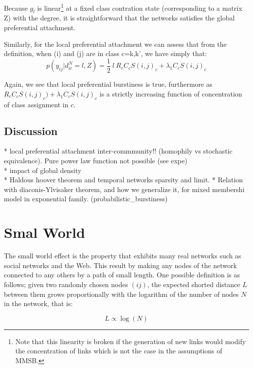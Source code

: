 \documentclass[a4paper, 12pt]{article}
\begin{document}
Because $g_l$ is linear\footnote{Note that this linearity is broken if the generation of new links would modify the concentration of links which is not the case in the assumptions of MMSB.} at a fixed class contration state (corresponding to a matrix Z) with the degree, it is straightforward  that the networks satisfies the global preferential attachment.

Similarly, for the local preferential attachment we can assess that from the definition, when (i) and (j) are in class c={k,k'}, we have simply that:
\begin{equation}
p(y_{ij} | d_{ic}^N=l, Z) = \frac{1}{2}\ l\ R_c  C_c S(i,j)_c + \lambda_1 C_c S(i,j)_c
\end{equation}

Again, we see that local preferential burstiness is true, furthermore as $ R_c  C_c  S(i,j)_c) + \lambda_1 C_c S(i,j)_c$ is a strictly increasing function of concentration of class assignment in $c$.

\subsection{Discussion}


* local preferential attachment inter-commmunity!! (homophily vs stochastic equivalence). Pure power law function not possible (see expe)\\
* impact of global density\\
* Haldous hoover theorem and temporal networks sparsity and limit.
* Relation with diaconis-Ylvisaker theorem, and how we generalize it, for mixed membershi model in exponential family. (probabilistic\_burstiness)

\section{Smal World}\label{smal-world}

The small world effect is the property that exhibits many real networks
such as social networks and the Web. This result by making any nodes of
the network connected to any others by a path of small length. One
possible definition is as follows; given  two randomly chosen nodes \((ij)\), the
expected shorted distance \(L\) between them grows proportionally with the logarithm
of the number of nodes \(N\) in the network, that is:

\begin{equation}
L \propto \log(N)
\end{equation}
\end{document}
